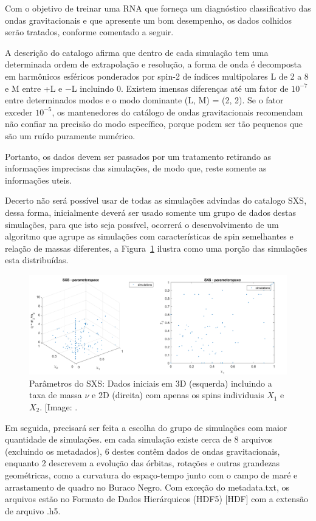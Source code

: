 Com o objetivo de treinar uma RNA que forneça um diagnóstico classificativo das ondas gravitacionais e que apresente um bom desempenho, os dados colhidos serão tratados, conforme comentado a seguir. 

A descrição do catalogo afirma que dentro de cada simulação tem uma determinada ordem de extrapolação e resolução, a forma de onda é decomposta em harmônicos esféricos ponderados por spin-2 de índices multipolares L de 2 a 8 e M entre +L e −L incluindo 0. Existem imensas diferenças até um fator de \(10^{−7}\) entre determinados modos e o modo dominante (L, M) = (2, 2). Se o fator exceder \(10^{-5}\), os mantenedores do catálogo de ondas gravitacionais recomendam não confiar na precisão do modo específico, porque podem ser tão pequenos que são um ruído puramente numérico.

Portanto, os dados devem ser passados por um tratamento retirando as informações imprecisas das simulações, de modo que, reste somente as informações uteis.

Decerto não será possível usar de todas as simulações advindas do catalogo SXS, dessa forma, inicialmente deverá ser usado somente um grupo de dados destas simulações, para que isto seja possível, ocorrerá o desenvolvimento de um algoritmo que agrupe as simulações com características de spin semelhantes e relação de massas diferentes, a Figura~\ref{figclusterizacao} ilustra como uma porção das simulações esta distribuídas.

\begin{figure}[ht]
\centering
\includegraphics[width=1\textwidth]{figuras/clusterizacao.png}
\caption{Parâmetros do SXS: Dados iniciais em 3D (esquerda) incluindo a taxa de massa \({\nu}\) e 2D (direita) com apenas os spins individuais \(X_1\) e \(X_2\). [Image: .}
\label{figclusterizacao}
\end{figure}

Em seguida, precisará ser feita a escolha do grupo de simulações com maior quantidade de simulações. em cada simulação existe cerca de 8 arquivos (excluindo os metadados), 6 destes contêm dados de ondas gravitacionais, enquanto 2 descrevem a evolução das órbitas, rotações e outras grandezas geométricas, como a curvatura do espaço-tempo junto com o campo de maré e arrastamento de quadro no Buraco Negro. Com exceção do metadata.txt, os arquivos estão no Formato de Dados Hierárquicos (HDF5) [HDF] com a extensão de arquivo .h5.

